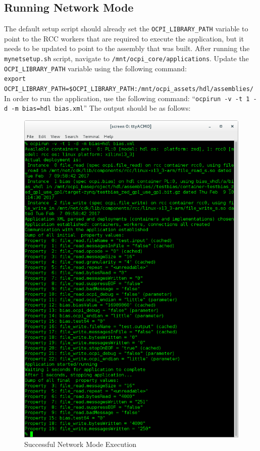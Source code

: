 \subsection{Running Network Mode}
The default setup script should already set the \texttt{OCPI\_LIBRARY\_PATH} variable to point to the RCC workers that are required to execute the application, but it needs to be updated to point to the assembly that was built.  After running the \texttt{mynetsetup.sh} script, navigate to  \texttt{/mnt/ocpi\_core/applications}. Update the \texttt{OCPI\_LIBRARY\_PATH} variable using the following command: \\
\texttt{export OCPI\_LIBRARY\_PATH=\$OCPI\_LIBRARY\_PATH:/mnt/ocpi\_assets/hdl/assemblies/}\\

\flushleft In order to run the application, use the following command: ``\texttt{ocpirun -v -t 1 -d -m bias=hdl bias.xml}'' The output should be as follows:
\begin{figure}[H]
	\centerline{\includegraphics[scale=0.5]{zed_net_bias}}
	\caption{Successful Network Mode Execution}
	\label{fig:netBias}
\end{figure}

